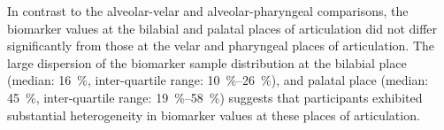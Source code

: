 \documentclass[reprint]{JASAnew}\usepackage[]{graphicx}\usepackage[]{color}
\begin{document}
In contrast to the alveolar-velar and alveolar-pharyngeal comparisons, the biomarker values at the bilabial and palatal places of articulation did not differ significantly from those at the velar and pharyngeal places of articulation. 
%
The large dispersion of the biomarker sample distribution at the bilabial place
%
(median: \SI{16}{\percent}, 
inter-quartile range: \SIrange{10}{26}{\percent}), 
%
and palatal place
%
(median: \SI{45}{\percent}, 
inter-quartile range: \SIrange{19}{58}{\percent})
%
suggests that participants exhibited substantial heterogeneity in biomarker values at these places of articulation.  







\end{document}
